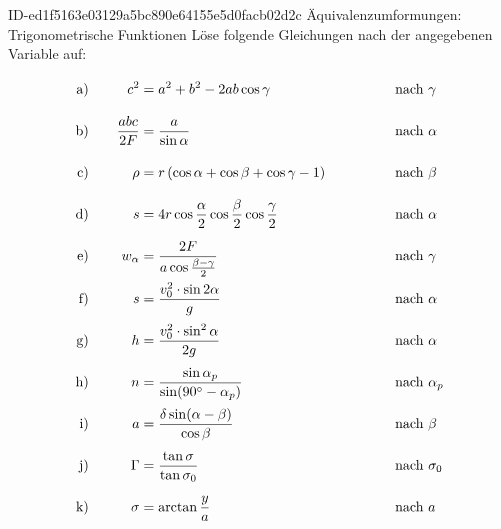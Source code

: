 \begin{exercise}
      {ID-ed1f5163e03129a5bc890e64155e5d0facb02d2c}
      {Äquivalenzumformungen: Trigonometrische Funktionen}
  \ifproblem\problem
    \newcommand{\exnum}[1]{\text{\rule[-2.5ex]{0pt}{6ex}#1}}
    Löse folgende Gleichungen nach der angegebenen Variable auf:
    \allowdisplaybreaks
    \begin{alignat*}{4}
      \exnum{a)}&\quad &          c^{2}&=a^{2}+b^{2}-2ab\cos\gamma                                                  & \quad&\quad & \quad&\text{nach $\gamma$}     \\
      \exnum{b)}&\quad & \frac{abc}{2F}&=\frac{a}{\sin\alpha}                                                       & \quad&\quad & \quad&\text{nach $\alpha$}     \\
      \exnum{c)}&\quad &           \rho&=r\left(\cos\alpha+\cos\beta+\cos\gamma-1\right)                            & \quad&\quad & \quad&\text{nach $\beta$}      \\
      \exnum{d)}&\quad &              s&=4r\cos\frac{\alpha}{2}\cos\frac{\beta}{2}\cos\frac{\gamma}{2}              & \quad&\quad & \quad&\text{nach $\alpha$}     \\
      \exnum{e)}&\quad &              w_{\alpha}&=\frac{2F}{a\cos\frac{\beta-\gamma}{2}}                            & \quad&\quad & \quad&\text{nach $\gamma$}     \\
      \exnum{f)}&\quad &              s&=\frac{v_{0}^{2}\cdot\sin2\alpha}{g}                                        & \quad&\quad & \quad&\text{nach $\alpha$}     \\
      \exnum{g)}&\quad &              h&=\frac{v_{0}^{2}\cdot\sin^{2}\alpha}{2g}                                    & \quad&\quad & \quad&\text{nach $\alpha$}     \\
      \exnum{h)}&\quad &              n&=\frac{\sin\alpha_{p}}{\sin(90^{\circ}-\alpha_{p})}                         & \quad&\quad & \quad&\text{nach $\alpha_{p}$} \\
      \exnum{i)}&\quad &              a&=\frac{\delta\sin(\alpha-\beta)}{\cos\beta}                                 & \quad&\quad & \quad&\text{nach $\beta$}      \\
      \exnum{j)}&\quad &        \Gamma&=\frac{\tan\sigma}{\tan\sigma_{0}}                                           & \quad&\quad & \quad&\text{nach $\sigma_{0}$} \\
      \exnum{k)}&\quad &        \sigma&=\arctan\frac{y}{a}                                                          & \quad&\quad & \quad&\text{nach $a$}          \\

\end{alignat*}
\end{exercise}
